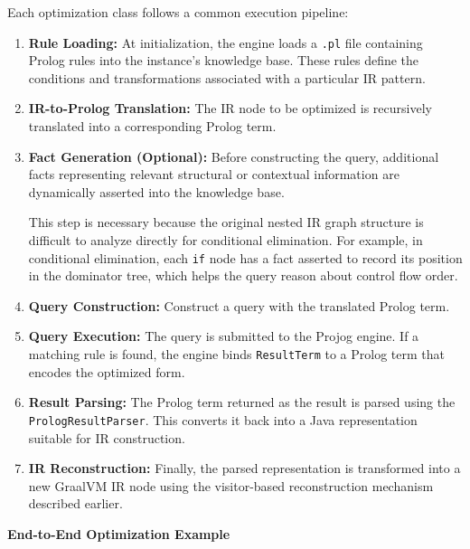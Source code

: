 Each optimization class follows a common execution pipeline:
\begin{enumerate}
    \item \textbf{Rule Loading:} At initialization, the engine loads a \texttt{.pl} file containing Prolog rules into the instance's knowledge base. These rules define the conditions and transformations associated with a particular IR pattern.
    
    \item \textbf{IR-to-Prolog Translation:} The IR node to be optimized is recursively translated into a corresponding Prolog term.

    \item \textbf{Fact Generation (Optional):} Before constructing the query, additional facts representing relevant structural or contextual information are dynamically asserted into the knowledge base.
    
    This step is necessary because the original nested IR graph structure is difficult to analyze directly for conditional elimination. For example, in conditional elimination, each \texttt{if} node has a fact asserted to record its position in the dominator tree, which helps the query reason about control flow order.

    \item \textbf{Query Construction:} Construct a query with the translated Prolog term.
    
    \item \textbf{Query Execution:} The query is submitted to the Projog engine. If a matching rule is found, the engine binds \texttt{ResultTerm} to a Prolog term that encodes the optimized form.
    
    \item \textbf{Result Parsing:} The Prolog term returned as the result is parsed using the \texttt{PrologResultParser}. This converts it back into a Java representation suitable for IR construction.
    
    \item \textbf{IR Reconstruction:} Finally, the parsed representation is transformed into a new GraalVM IR node using the visitor-based reconstruction mechanism described earlier.
\end{enumerate}

\textbf{End-to-End Optimization Example}


